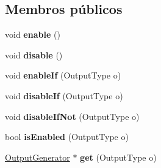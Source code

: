 \subsection*{Membros públicos}
\begin{DoxyCompactItemize}
\item 
\hypertarget{class_html_generator_a486f22824bd83c5308a0d70ffac6f758}{void {\bfseries enable} ()}\label{class_html_generator_a486f22824bd83c5308a0d70ffac6f758}

\item 
\hypertarget{class_html_generator_a8cfbbe53c1cf6e3054736daea3044c0f}{void {\bfseries disable} ()}\label{class_html_generator_a8cfbbe53c1cf6e3054736daea3044c0f}

\item 
\hypertarget{class_html_generator_a4cb683868aced938e5825344efcabbac}{void {\bfseries enable\-If} (Output\-Type o)}\label{class_html_generator_a4cb683868aced938e5825344efcabbac}

\item 
\hypertarget{class_html_generator_a7631c8cb9b2794dd29fbf9fc4f4e3fdc}{void {\bfseries disable\-If} (Output\-Type o)}\label{class_html_generator_a7631c8cb9b2794dd29fbf9fc4f4e3fdc}

\item 
\hypertarget{class_html_generator_a50896e6fa0a1ae81a11e07bc2d86bcbb}{void {\bfseries disable\-If\-Not} (Output\-Type o)}\label{class_html_generator_a50896e6fa0a1ae81a11e07bc2d86bcbb}

\item 
\hypertarget{class_html_generator_a79a2b8ce4bca9910d02b7a54ea547aba}{bool {\bfseries is\-Enabled} (Output\-Type o)}\label{class_html_generator_a79a2b8ce4bca9910d02b7a54ea547aba}

\item 
\hypertarget{class_html_generator_a256fd8270e935e213d393fb88d0f3737}{\hyperlink{class_output_generator}{Output\-Generator} $\ast$ {\bfseries get} (Output\-Type o)}\label{class_html_generator_a256fd8270e935e213d393fb88d0f3737}


\end{DoxyCompactItemize}
